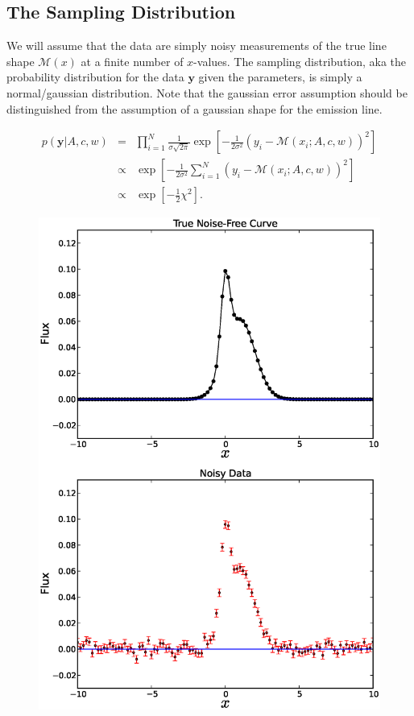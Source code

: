 \documentclass[letterpaper, 11pt]{article}
\newcommand{\yy}{\mathbf{y}}
\begin{document}
\subsection{The Sampling Distribution}
We will assume that the data are simply noisy measurements of the true line shape
$\mathcal{M}(x)$ at a finite number of $x$-values.
The sampling distribution, aka the probability distribution for the data $\yy$ given
the parameters, is simply a normal/gaussian distribution. Note that the
gaussian error assumption should be distinguished from the assumption of a gaussian
shape for the emission line.

\begin{eqnarray}
p(\yy|A, c, w) &=& \prod_{i=1}^N
\frac{1}{\sigma\sqrt{2\pi}}
\exp
\left[
-\frac{1}{2\sigma^2}\left(y_i - \mathcal{M}(x_i; A, c, w)\right)^2
\right] \\
&\propto& \exp\left[-\frac{1}{2\sigma^2}\sum_{i=1}^N\left(y_i - \mathcal{M}(x_i; A, c, w)\right)^2\right] \\
&\propto& \exp\left[-\frac{1}{2}\chi^2\right].
\end{eqnarray}


\begin{figure}
\begin{center}
\includegraphics[scale=0.5]{emission_line.eps}
\end{center}
\end{figure}
\end{document}
